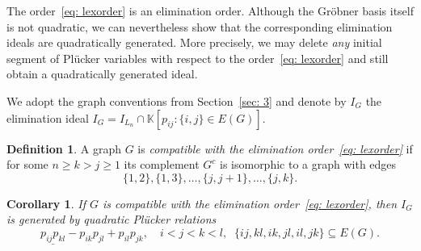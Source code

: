 \documentclass[12pt,a4paper]{amsart}
\newtheorem{Corollary}[Theorem]{Corollary}
\theoremstyle{definition}
\newtheorem{Definition}[Theorem]{Definition}
\begin{document}
The order~\eqref{eq: lexorder} is an elimination order. 
Although the Gröbner basis itself is not quadratic, we can nevertheless show
that the corresponding elimination ideals are quadratically generated.
More precisely, we may delete \emph{any} initial segment of Plücker variables
with respect to the order~\eqref{eq: lexorder} and still obtain a
quadratically generated ideal.

We adopt the graph conventions from Section~\ref{sec: 3} and denote
by $I_G$ the elimination ideal
$
I_G = I_{L_n} \cap \mathbb{K}[p_{ij} : \{i,j\} \in E(G)].
$

\begin{Definition}
A graph $G$ is \emph{compatible with the elimination order~\eqref{eq: lexorder}} if for some $n \geq k > j \geq 1$ its complement $G^c$ is isomorphic to a graph with edges
\[
\{1,2\},\{1,3\},\dots,\{j,j+1\},\dots,\{j,k\}.
\]
\end{Definition}
\begin{Corollary}
If $G$ is compatible with the elimination order~\eqref{eq: lexorder}, then $I_G$ is generated by quadratic Plücker relations
\begin{equation}\label{eq: quadrics_from_edges}
    \underline{p_{ij}p_{kl}} - p_{ik}p_{jl} + p_{il}p_{jk}, 
    \quad i<j<k<l,\;\; \{ij,kl,ik,jl,il,jk\}\subseteq E(G).
\end{equation}
\end{Corollary}
\end{document}

